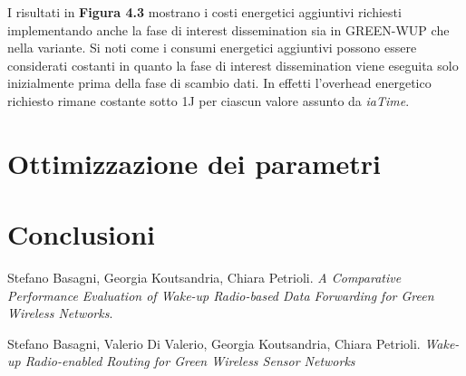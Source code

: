 \documentclass[binding=0.6cm,TFA]{sapthesis}
\begin{document}
I risultati in \textbf{Figura 4.3} mostrano i costi energetici aggiuntivi richiesti implementando anche la fase di interest
dissemination sia in GREEN-WUP che nella variante. Si noti come i consumi energetici aggiuntivi possono essere considerati costanti in quanto
la fase di interest dissemination viene eseguita solo inizialmente prima della fase di scambio dati. In effetti l'overhead energetico
richiesto rimane costante sotto 1J per ciascun valore assunto da \emph{iaTime}.


\chapter{Ottimizzazione dei parametri}

\chapter{Conclusioni}

\backmatter
\cleardoublepage
{} %

\begin{thebibliography}{9}

    Stefano Basagni, Georgia Koutsandria, Chiara Petrioli.
    \textit{A Comparative Performance Evaluation of Wake-up Radio-based Data Forwarding for Green Wireless Networks}.

    Stefano Basagni, Valerio Di Valerio, Georgia Koutsandria, Chiara Petrioli.
    \textit{Wake-up Radio-enabled Routing for Green Wireless Sensor Networks}
\end{thebibliography}
\end{document}
